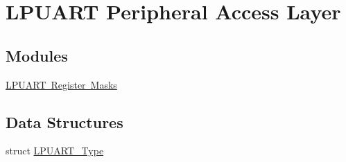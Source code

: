 \hypertarget{group___l_p_u_a_r_t___peripheral___access___layer}{}\section{L\+P\+U\+A\+RT Peripheral Access Layer}
\label{group___l_p_u_a_r_t___peripheral___access___layer}
\subsection*{Modules}
\begin{DoxyCompactItemize}
\item 
\mbox{\hyperlink{group___l_p_u_a_r_t___register___masks}{L\+P\+U\+A\+R\+T Register Masks}}
\end{DoxyCompactItemize}
\subsection*{Data Structures}
\begin{DoxyCompactItemize}
\item 
struct \mbox{\hyperlink{struct_l_p_u_a_r_t___type}{L\+P\+U\+A\+R\+T\+\_\+\+Type}}
\end{DoxyCompactItemize}
